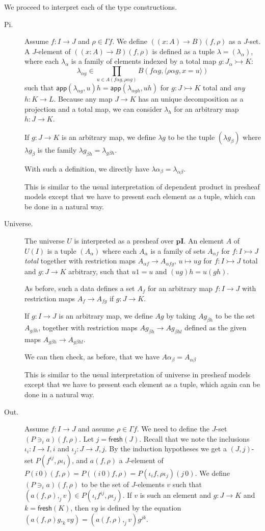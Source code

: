 \documentclass[english]{PaperTools/latex/lipics}
\newcommand\op[1]{∋_{#1}}
\def\pI{\ensuremath{\mathbf{pI}}}
\def\fresh#1{\mathsf{fresh}(#1)}
\def\app#1#2{\mathsf{app}(#1,#2)}
\begin{document}
\bigskip
We proceed to interpret each of the type constructions.
\begin{description}
  \item[\sc Pi.]
    Assume $f : I → J$ and $ρ ∈ Γf$. We define $((x:A) → B)(f,ρ)$ as a $J$-set.
    A $J$-element of $((x:A) → B)(f,ρ)$ is defined as a tuple $λ = (λ_α)$,
    where each $λ_α$ is a family of elements indexed by a total map $g : J_α ↣ K$:
    $$λ_{α g} ∈ \prod_{u ∈ A(fα g,ραg)} B(fαg,⟨ραg,x=u⟩)$$
    such that
    $\app{λ_{αg}}{u} h = \app{λ_{α gh}}{uh}$ for $g : J ↣ K$ total and \emph{any} $h : K → L$.
    Because any map $J → K$ has an unique decomposition as a projection and a total
    map, we can consider $λ_h$ for an arbitrary map $h : J → K$.

    If $g : J → K$ is an arbitrary map, we define $λ g$ to be the tuple
    $(λ g_β)$ where $λ g_β$ is the family $λ g_{βh} = λ_{gβh}$.

    With such a definition, we directly have $λα_{β} = λ_{αβ}$.

    This is similar to the usual interpretation of dependent product in
    presheaf models \citep{Hofmann97syntaxand,bezem2014model} except that we
    have to present each element as a tuple, which can be done in a natural way.


  \item[\sc Universe.]
    The universe $U$ is interpreted as a presheaf over \pI. An element $A$ of
    $U(I)$ is a tuple $(A_α)$ where each $A_α$ is a family of sets
    $A_{α f}$ for $f : I ↣ J$ \emph{total} together with restriction
    maps $A_{α f} → A_{α fg}$, $u ↦ ug$ for $f : I ↣ J$ total
    and $g : J → K$ arbitrary, such that $u1 = u$ and $(ug)h = u(gh)$.

    As before, such a data defines a set $A_f$ for an arbitrary map $f : I → J$
    with restriction maps $A_f → A_{fg}$ if $g : J → K$.

    If $g : I → J$ is an arbitrary map, we define $Ag$ by taking $Ag_{βh}$
    to be the set $A_{gβh}$, together with restriction maps $Ag_{βh} → Ag_{βhl}$
    defined as the given maps $A_{gβh} → A_{gβhl}$.

    We can then check, as before, that we have $Aα_{β} = A_{αβ}$

    This is similar to the usual interpretation of universe in
    presheaf models \citep{Hofmann97syntaxand,bezem2014model} except that we
    have to present each element as a tuple, which again can be done in a natural way.


  \item[\sc Out.]
    Assume $f : I → J$ and assume $ρ ∈ Γf$.  We need to define the $J$-set $(P \op {i} a)(f,ρ)$.
    Let $j = \fresh J$.
    Recall that we note the inclusions $ι_i : I → I,i$ and $ι_j : J → J,j$.
    By the induction hypotheses we get a $(J,j)$-set $P(f^{ij},ρι_i)$, and $a(f,ρ)$
    a $J$-element of $P(i\,0)(f,ρ) = P((i\,0)f,ρ) = P(ι_i f,ρι_j)(j\,0)$.
    We define $(P \op {i} a)(f,ρ)$ to be the set of $J$-elements $v$ such that
    $(a(f,ρ),_j v) ∈ P(ι_i f^{ij},ρι_j)$. If $v$ is such an element and $g : J → K$
    and $k=\fresh K$, then $vg$ is defined by the equation
    $(a(f,ρ)g,_k vg) = (a(f,ρ) ,_j v) g^{jk}$.



\end{description}
\end{document}
